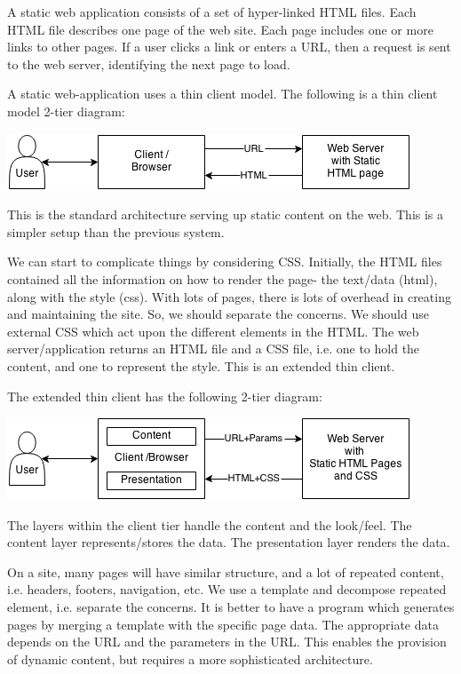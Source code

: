 \documentclass[a4paper, openany]{memoir}
\begin{document}
\noindent A static web application consists of a set of hyper-linked HTML files. Each HTML file describes one page of the web site. Each page includes one or more links to other pages. If a user clicks a link or enters a URL, then a request is sent to the web server, identifying the next page to load.

\noindent A static web-application uses a thin client model. The following is a thin client model 2-tier diagram:
\begin{center}
    \includegraphics[scale=0.8]{src/L7I3.png}
\end{center}
This is the standard architecture serving up static content on the web. This is a simpler setup than the previous system.

\noindent We can start to complicate things by considering CSS. Initially, the HTML files contained all the information on how to render the page- the text/data (html), along with the style (css). With lots of pages, there is lots of overhead in creating and maintaining the site. So, we should separate the concerns. We should use external CSS which act upon the different elements in the HTML. The web server/application returns an HTML file and a CSS file, i.e. one to hold the content, and one to represent the style. This is an extended thin client.

\noindent The extended thin client has the following 2-tier diagram:
\begin{center}
    \includegraphics[scale=0.8]{src/L7I4.png}
\end{center}
The layers within the client tier handle the content and the look/feel. The content layer represents/stores the data. The presentation layer renders the data.

\noindent On a site, many pages will have similar structure, and a lot of repeated content, i.e. headers, footers, navigation, etc. We use a template and decompose repeated element, i.e. separate the concerns. It is better to have a program which generates pages by merging a template with the specific page data. The appropriate data depends on the URL and the parameters in the URL. This enables the provision of dynamic content, but requires a more sophisticated architecture.
\end{document}
